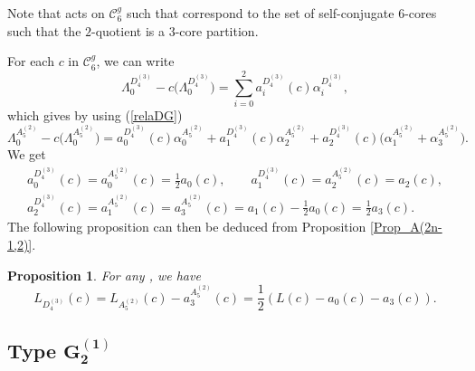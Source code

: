 \documentclass[pdftex]{sigma}
\newtheorem{Proposition}[Theorem]{Proposition}
 { \theoremstyle{definition}
\newtheorem{Definition}[Theorem]{Definition}
\newtheorem{Note}[Theorem]{Note}
\newtheorem{Example}[Theorem]{Example}
\newtheorem{Remark}[Theorem]{Remark} }
\numberwithin{equation}{section}
\begin{document}
\begin{Remark}%
Note that  acts on $\mathcal{C}_{6}^{g}$ such that  correspond to the set of self-conjugate $6$-cores such that the $2$-quotient is a $3$-core partition.
\end{Remark}

For each $c$ in $\mathcal{C}_{6}^{g}$, we can write%
\begin{equation*}
\Lambda _{0}^{D_{4}^{(3)}}-c\bigl(\Lambda
_{0}^{D_{4}^{(3)}}\bigr)=\sum_{i=0}^{2}a_{i}^{D_{4}^{(3)}}(c)\alpha
_{i}^{D_{4}^{(3)}},
\end{equation*}%
which gives by using (\ref{relaDG})%
\begin{equation*}
\Lambda _{0}^{A_{5}^{(2)}}-c\bigl(\Lambda
_{0}^{A_{5}^{(2)}}\bigr)=a_{0}^{D_{4}^{(3)}}(c)\alpha
_{0}^{A_{5}^{(2)}}+a_{1}^{D_{4}^{(3)}}(c)\alpha
_{2}^{A_{5}^{(2)}}+a_{2}^{D_{4}^{(3)}}(c)\bigl(\alpha _{1}^{A_{5}^{(2)}}+\alpha
_{3}^{A_{5}^{(2)}}\bigr).
\end{equation*}%
We get%
\begin{gather*}
a_{0}^{D_{4}^{(3)}}(c)=a_{0}^{A_{5}^{(2)}}(c)=\frac{1}{2}a_{0}(c), \qquad
a_{1}^{D_{4}^{(3)}}(c)=a_{2}^{A_{5}^{(2)}}(c)=a_{2}(c), \\
a_{2}^{D_{4}^{(3)}}(c)=a_{1}^{A_{5}^{(2)}}(c)=a_{3}^{A_{5}^{(2)}}(c)=a_{1}(c)-
\frac{1}{2}a_{0}(c)=\frac{1}{2}a_{3}(c).
\end{gather*}
The following proposition can then be deduced from Proposition \ref{Prop_A(2n-1,2)}.

\begin{Proposition}
\label{Prop_D(4,3)}	For any , we have
	\begin{equation*}
	L_{D_{4}^{(3)}}(c)=L_{A_{5}^{(2)}}(c)-a_{3}^{A_{5}^{(2)}}(c)=\frac{1}{2}
	(L(c)-a_{0}(c)-a_{3}(c)).
	\end{equation*}
\end{Proposition}

\subsection[Type G\_2\^{}(1)]{Type $\boldsymbol{G_{2}^{(1)}}$}
\end{document}
